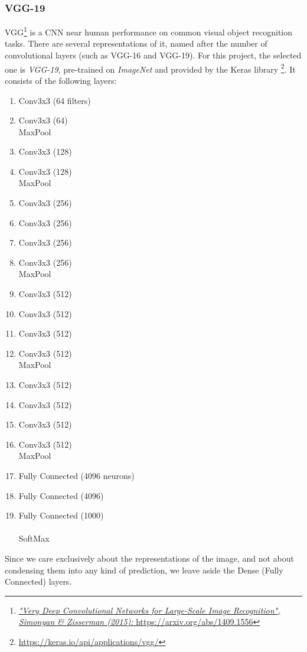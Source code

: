 \subsubsection{VGG-19}
VGG\footnote{\href{https://arxiv.org/abs/1409.1556}{\emph{"Very Deep Convolutional Networks for Large-Scale Image Recognition", Simonyan \& Zisserman (2015):} https://arxiv.org/abs/1409.1556}}
is a CNN near human performance on common visual object recognition tasks.
There are several representations of it, named after the number of convolutional layers (such as VGG-16 and VGG-19).
For this project, the selected one is \emph{VGG-19}, pre-trained on \emph{ImageNet} and provided by the Keras library
\footnote{\href{https://keras.io/api/applications/vgg/}{https://keras.io/api/applications/vgg/}}. It consists of the following layers:
\begin{multicols}{2}
    \begin{enumerate}
        \item Conv3x3 (64 filters)
        \item Conv3x3 (64)\\
        MaxPool
        \item Conv3x3 (128)
        \item Conv3x3 (128)\\
        MaxPool
        \item Conv3x3 (256)
        \item Conv3x3 (256)
        \item Conv3x3 (256)
        \item Conv3x3 (256)\\
        MaxPool
        \item Conv3x3 (512)
        \item Conv3x3 (512)
        \item Conv3x3 (512)
        \item Conv3x3 (512)\\
        MaxPool
        \item Conv3x3 (512)
        \item Conv3x3 (512)
        \item Conv3x3 (512)
        \item Conv3x3 (512)\\
        MaxPool
        \item Fully Connected (4096 neurons)
        \item Fully Connected (4096)
        \item Fully Connected (1000)\\\\
        SoftMax
    \end{enumerate}
\end{multicols}
Since we care exclusively about the representations of the image, and not about condensing them into any kind of prediction,
we leave aside the Dense (Fully Connected) layers.
